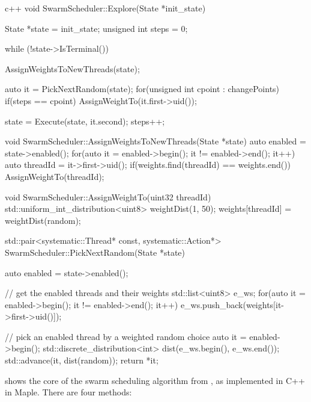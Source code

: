 \begin{listing}
\centering
\begin{cminted}{c++}
void SwarmScheduler::Explore(State *init_state) {
  State *state = init_state;
  unsigned int steps = 0;

  while (!state->IsTerminal()) {
    AssignWeightsToNewThreads(state);

    auto it = PickNextRandom(state);
    for(unsigned int cpoint : changePoints) {
      if(steps == cpoint) {
        AssignWeightTo(it.first->uid());
      }
    }

    state = Execute(state, it.second);
    steps++;
  }
}

void SwarmScheduler::AssignWeightsToNewThreads(State *state) {
  auto enabled = state->enabled();
  for(auto it = enabled->begin(); it != enabled->end(); it++) {
    auto threadId = it->first->uid();
    if(weights.find(threadId) == weights.end()) {
      AssignWeightTo(threadId);
    }
  }
}

void SwarmScheduler::AssignWeightTo(uint32 threadId) {
  std::uniform_int_distribution<uint8> weightDist(1, 50);
  weights[threadId] = weightDist(random);
}

std::pair<systematic::Thread* const, systematic::Action*>
SwarmScheduler::PickNextRandom(State *state) {
  auto enabled = state->enabled();

  // get the enabled threads and their weights
  std::list<uint8> e_ws;
  for(auto it = enabled->begin(); it != enabled->end(); it++) {
    e_ws.push_back(weights[it->first->uid()]);
  }

  // pick an enabled thread by a weighted random choice
  auto it = enabled->begin();
  std::discrete_distribution<int> dist(e_ws.begin(), e_ws.end());
  std::advance(it, dist(random));
  return *it;
}
\end{cminted}
\caption{The core of the C++ swarm scheduling algorithm, implemented in Maple.}\label{lst:swarm}
\end{listing}

 shows the core of the swarm scheduling algorithm from
, as implemented in C++ in Maple.  There are four
methods:

